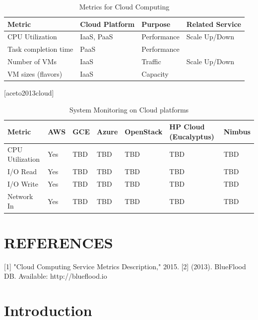\documentclass{sig-alternate-05-2015}
\begin{document}
\begin{table}[htb]
\caption{Metrics for Cloud Computing}
\label{T:NMmetrics}
\bigskip
\begin{tabular}{p{}p{}p{}p{}}
Metric & Cloud Platform & Purpose & Related Service \\
\hline
CPU Utilization &
IaaS, PaaS &
Performance &
Scale Up/Down \\
\hline
Task completion time &
PaaS &
Performance &
\\
\hline
Number of VMs &
IaaS &
Traffic &
Scale Up/Down \\
\hline
VM sizes (flavors) &
IaaS &
Capacity &
\\
\hline
\end{tabular}
\end{table}
[aceto2013cloud]

\begin{table}[htb]
\caption{System Monitoring on Cloud platforms}
\label{T:SMmetrics}
\bigskip
\begin{tabular}{p{}p{}p{}p{}p{}p{}p{}}
Metric & AWS & GCE & Azure & OpenStack & HP Cloud (Eucalyptus) & Nimbus \\
\hline
CPU Utilization & Yes & TBD & TBD & TBD & TBD & TBD \\
\hline
I/O Read & Yes & TBD & TBD & TBD & TBD & TBD \\
\hline
I/O Write & Yes & TBD & TBD & TBD & TBD & TBD \\
\hline
Network In & Yes & TBD & TBD & TBD & TBD & TBD \\
\hline
\end{tabular}
\end{table}




\section{REFERENCES}

[1]     "Cloud Computing Service Metrics Description," 2015.
[2]     (2013). BlueFlood DB. Available: http://blueflood.io



  
\section{Introduction} 
\end{document}

